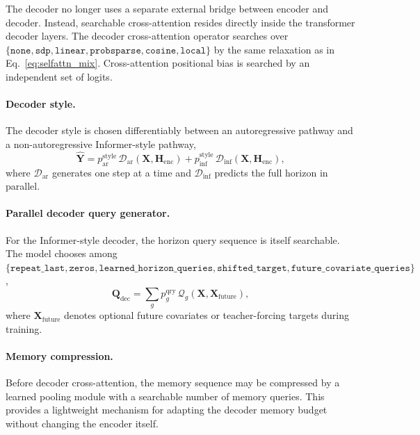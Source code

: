 The decoder no longer uses a separate external bridge between encoder and
decoder. Instead, searchable cross-attention resides directly inside the
transformer decoder layers. The decoder cross-attention operator searches over
$\{\texttt{none},\texttt{sdp},\texttt{linear},\texttt{probsparse},
\texttt{cosine},\texttt{local}\}$ by the same relaxation as in
Eq.~\eqref{eq:selfattn_mix}. Cross-attention positional bias is searched by
an independent set of logits.

\paragraph{Decoder style.}
The decoder style is chosen differentiably between an autoregressive pathway
and a non-autoregressive Informer-style pathway,
%
\begin{equation}
    \hat{\mathbf{Y}} =
      p^{\mathrm{style}}_{\mathrm{ar}}\,
      \mathcal{D}_{\mathrm{ar}}(\mathbf{X}, \mathbf{H}_{\mathrm{enc}})
      +
      p^{\mathrm{style}}_{\mathrm{inf}}\,
      \mathcal{D}_{\mathrm{inf}}(\mathbf{X}, \mathbf{H}_{\mathrm{enc}}),
    \label{eq:decoder_style}
\end{equation}
%
where $\mathcal{D}_{\mathrm{ar}}$ generates one step at a time and
$\mathcal{D}_{\mathrm{inf}}$ predicts the full horizon in parallel.

\paragraph{Parallel decoder query generator.}
For the Informer-style decoder, the horizon query sequence is itself
searchable. The model chooses among
$\{\texttt{repeat\_last},\texttt{zeros},
\texttt{learned\_horizon\_queries},\texttt{shifted\_target},
\texttt{future\_covariate\_queries}\}$,
%
\begin{equation}
    \mathbf{Q}_{\mathrm{dec}} = \sum_{g} p^{\mathrm{qry}}_g\,
      \mathcal{Q}_g(\mathbf{X}, \mathbf{X}_{\mathrm{future}}),
    \label{eq:query_mix}
\end{equation}
%
where $\mathbf{X}_{\mathrm{future}}$ denotes optional future covariates or
teacher-forcing targets during training.

\paragraph{Memory compression.}
Before decoder cross-attention, the memory sequence may be compressed by a
learned pooling module with a searchable number of memory queries. This
provides a lightweight mechanism for adapting the decoder memory budget
without changing the encoder itself.

